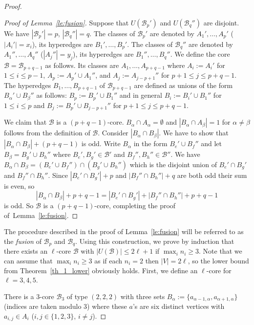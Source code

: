 \documentclass[10pt,a4paper]{amsart}
\def\cB{{\mathcal{B}}}
\begin{document}
\begin{proof}
\begin{proof}[Proof of Lemma~\ref{le:fusion}]
Suppose that $U(\cB_p')$ and  $U(\cB_q'')$ are disjoint.
We have  $|\cB_p'|=p$, $|\cB_q''|=q$.
The classes of $\cB_p'$ are denoted by
 $A_1', \dots, A_p'$ ($|A_i'|=x_i$), its hyperedges are $B_1', \dots, B_p'$.
The classes of $\cB_q''$ are denoted by
 $A_1'', \dots, A_q''$ ($|A_j''|=y_j$), its hyperedges are $B_1'', \dots, B_q''$.
We define the core $\cB=\cB_{p+q-1}$ as follows.
Its classes are $A_1, \dots, A_{p+q-1}$ where $A_i:= A_i'$ for $1\leq i\leq p-1$, $A_p:=A_p'\cup A_1''$, and
 $A_j:= A_{j-p+1}''$ for $p+1\leq j \leq p+q-1$.
The hyperedges $B_1, \dots, B_{p+q-1}$ of $\cB_{p+q-1}$ are defined as unions of the form $B_\alpha'\cup B_\beta''$ as follows:
$B_p:= B_p'\cup B_1''$ and in general $B_i:= B_i'\cup B_1''$ for $1 \leq i\leq p$ and $B_j:= B_p'\cup B_{j-p+1}''$ for $p+1\leq j\leq p+q-1$.


We claim that $\cB$ is a $(p+q-1)$-core.
 $B_\alpha\cap A_\alpha=\emptyset$ and $|B_\alpha\cap A_\beta|=1$ for $\alpha\neq \beta$ follows from the definition of $\cB$.
Consider $|B_\alpha \cap B_\beta|$. We have to show that $|B_\alpha \cap B_\beta| +(p+q-1)$ is odd.
Write $B_\alpha$ in the form $B_e'\cup B_f''$ and let $B_\beta=B_g'\cup B_h''$ where $B_e', B_g'\in \cB'$ and $B_f'', B_h''\in \cB''$.
We have $B_\alpha \cap B_\beta= (B_e'\cup B_f'') \cap (B_g'\cup B_h'')$ which is the disjoint union of
$B_e'\cap B_g'$ and $B_f''\cap B_h''$.
Since $|B_e'\cap B_g'|+p$ and $|B_f''\cap B_h''|+q$ are both odd their sum is even, so
$$
 |B_\alpha \cap B_\beta|+p+q-1= |B_e'\cap B_g'|+|B_f''\cap B_h''|+p+q-1$$
   is odd.
So $\cB$ is a $(p+q-1)$-core, completing the proof of~Lemma~\ref{le:fusion}.
\end{proof}

The procedure described in the proof of Lemma~\ref{le:fusion}
will be referred to as the {\em fusion} of $\cB_p$ and $\cB_q$. Using this construction, we prove by induction that there exists an $\ell$-core $\cB$ with $|U(\cB)| \leq 2\ell+1$ if $\max_{i} n_i\geq 3$. Note that we can assume that $\max_{i} n_i\geq 3$ as if each $n_i=2$ then $|V|= 2\ell$, so the lower bound from Theorem~\ref{th_1_lower} obviously holds.
First, we define an $\ell$-core for $\ell=3,4,5$.

There is a $3$-core $\cB_3$ of type $(2,2,2)$ with three sets $B_\alpha:=\{ a_{\alpha-1, \alpha}, a_{\alpha+1, \alpha}\}$ (indices are taken modulo 3) where these $a$'s are six distinct vertices with $a_{i,j}\in A_i$ ($i,j\in \{ 1,2,3\}$, $i\neq j$).


\end{proof}
\end{document}
